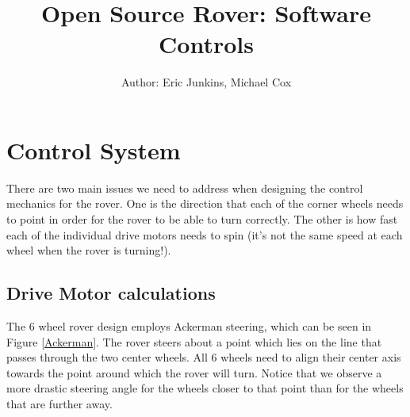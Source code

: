 \documentclass[12pt]{article}
\begin{document}
\title{Open Source Rover: Software Controls}
\author{Author: Eric Junkins, Michael Cox}

\makeatletter         
\def\@maketitle{
\begin{center}	
	\makebox[\textwidth][c]{ \texttt{[image: "Pictures/software title".png]}}
	{\Huge \bfseries \sffamily \@title }\\[3ex] 
	{\Large \sffamily \@author}\\[3ex] 
	\texttt{[image: "Pictures/JPL logo".png]}
\end{center}}
\makeatother

\maketitle


\newpage

\tableofcontents

\newpage


\section{Control System}

There are two main issues we need to address when designing the control mechanics for the rover. One is the direction that each of the corner wheels needs to point in order for the rover to be able to turn correctly. The other is how fast each of the individual drive motors needs to spin (it's not the same speed at each wheel when the rover is turning!). 

\subsection{Drive Motor calculations}
The 6 wheel rover design employs Ackerman steering, which can be seen in Figure \ref{Ackerman}. The rover steers about a point which lies on the line that passes through the two center wheels. All 6 wheels need to align their center axis towards the point around which the rover will turn. Notice that we observe a more drastic steering angle for the wheels closer to that point than for the wheels that are further away. 
\end{document}
